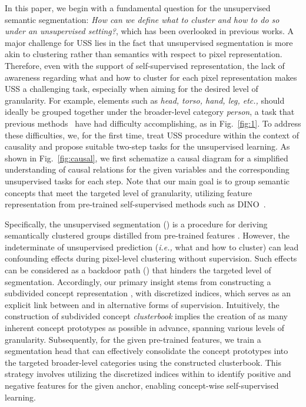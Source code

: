 \documentclass{article} \usepackage{iclr2024_conference,times}
\begin{document}
In this paper, we begin with a fundamental question for the unsupervised semantic segmentation: \textit{How can we define what to cluster and how to do so under an unsupervised setting?}, which has been overlooked in previous works. A major challenge for USS lies in the fact that unsupervised segmentation is more akin to clustering rather than semantics with respect to pixel representation. Therefore, even with the support of self-supervised representation, the lack of awareness regarding what and how to cluster for each pixel representation makes USS a challenging task, especially when aiming for the desired level of granularity. For example, elements such as \textit{head, torso, hand, leg, etc.,} should ideally be grouped together under the broader-level category \textit{person}, a task that previous methods~\citep{hamilton2022unsupervised, seong2023leveraging} have had difficulty accomplishing, as in Fig.~\ref{fig:1}. To address these difficulties, we, for the first time, treat USS procedure within the context of causality and propose suitable two-step tasks for the unsupervised learning. As shown in Fig.~\ref{fig:causal}, we first schematize a causal diagram for a simplified understanding of causal relations for the given variables and the corresponding unsupervised tasks for each step. Note that our main goal is to group semantic concepts  that meet the targeted level of granularity, utilizing feature representation  from pre-trained self-supervised methods such as DINO~\citep{caron2021emerging}.




Specifically, the unsupervised segmentation () is a procedure for deriving semantically clustered groups  distilled from pre-trained features . However, the indeterminate  of unsupervised prediction (\textit{i.e.,} what and how to cluster) can lead confounding effects during pixel-level clustering without supervision. Such effects can be considered as a backdoor path () that hinders the targeted level of segmentation. Accordingly, our primary insight stems from constructing a subdivided concept representation , with discretized indices, which serves as an explicit link between  and  in alternative forms of supervision. Intuitively, the construction of subdivided concept \textit{clusterbook}  implies the creation of as many inherent concept prototypes as possible in advance, spanning various levels of granularity. Subsequently, for the given pre-trained features, we train a segmentation head that can effectively consolidate the concept prototypes into the targeted broader-level categories using the constructed clusterbook. This strategy involves utilizing the discretized indices within  to identify positive and negative features for the given anchor, enabling concept-wise self-supervised learning.
\end{document}
